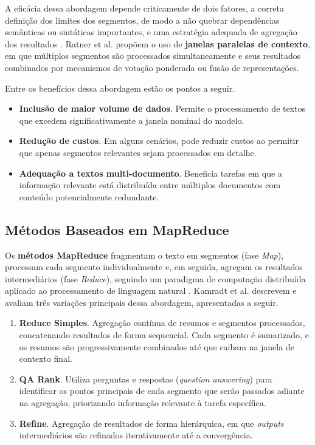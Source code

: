 A eficácia dessa abordagem depende criticamente de dois fatores, a correta definição dos limites dos segmentos, de modo a não quebrar dependências semânticas ou sintáticas importantes, e uma estratégia adequada de agregação dos resultados \cite{ratner2023parallelwindows}. Ratner et al. \cite{ratner2023parallelwindows} propõem o uso de \textbf{janelas paralelas de contexto}, em que múltiplos segmentos são processados simultaneamente e seus resultados combinados por mecanismos de votação ponderada ou fusão de representações.

Entre os benefícios dessa abordagem estão os pontos a seguir.

\begin{itemize}[leftmargin=1.6em]
\item \textbf{Inclusão de maior volume de dados}. Permite o processamento de textos que excedem significativamente a janela nominal do modelo.

\item \textbf{Redução de custos}. Em alguns cenários, pode reduzir custos ao permitir que apenas segmentos relevantes sejam processados em detalhe.

\item \textbf{Adequação a textos multi-documento}. Beneficia tarefas em que a informação relevante está distribuída entre múltiplos documentos com conteúdo potencialmente redundante.
\end{itemize}

\subsection{Métodos Baseados em MapReduce}
\label{subsec:mapreduce}

Os \textbf{métodos MapReduce} fragmentam o texto em segmentos (fase \textit{Map}), processam cada segmento individualmente e, em seguida, agregam os resultados intermediários (fase \textit{Reduce}), seguindo um paradigma de computação distribuída aplicado ao processamento de linguagem natural \cite{kamradt2023workaround}. Kamradt et al. \cite{kamradt2023workaround} descrevem e avaliam três variações principais dessa abordagem, apresentadas a seguir.

\begin{enumerate}[leftmargin=1.8em]
\item \textbf{Reduce Simples}. Agregação contínua de resumos e segmentos processados, concatenando resultados de forma sequencial. Cada segmento é sumarizado, e os resumos são progressivamente combinados até que caibam na janela de contexto final.

\item \textbf{QA Rank}. Utiliza perguntas e respostas (\textit{question answering}) para identificar os pontos principais de cada segmento que serão passados adiante na agregação, priorizando informação relevante à tarefa específica.

\item \textbf{Refine}. Agregação de resultados de forma hierárquica, em que \textit{outputs} intermediários são refinados iterativamente até a convergência.
\end{enumerate}

